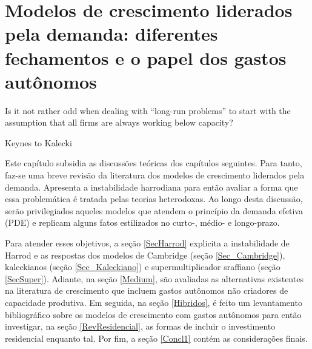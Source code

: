 \chapter{Modelos de crescimento liderados pela demanda: diferentes fechamentos e o papel dos gastos autônomos}
\label{CapTeorico}

\epigraph{Is it not rather odd when dealing with ``long-run problems'' to start with the assumption that all firms are always working below capacity?}{Keynes to Kalecki}


Este capítulo subsidia as discussões teóricas dos capítulos seguintes.
Para tanto, faz-se uma breve revisão da literatura dos modelos de crescimento liderados pela demanda. Apresenta a instabilidade harrodiana para então avaliar a forma que essa problemática é tratada pelas teorias heterodoxas.
Ao longo desta discussão, serão privilegiados aqueles modelos que atendem o princípio da demanda efetiva (PDE)  e replicam alguns fatos estilizados no curto-, médio- e longo-prazo.


Para atender esses objetivos, a seção \ref{SecHarrod} explicita a instabilidade de Harrod e as respostas dos modelos de Cambridge (seção \ref{Sec_Cambridge}), kaleckianos (seção \ref{Sec_Kaleckiano}) e supermultiplicador sraffiano (seção \ref{SecSuper}). 
Adiante, na seção \ref{Medium}, são avaliadas as alternativas existentes na literatura de crescimento que incluem gastos autônomos não criadores de capacidade produtiva.
Em seguida, na seção \ref{Hibridos}, é feito um levantamento bibliográfico sobre os modelos de crescimento com gastos autônomos para então investigar, na seção \ref{RevResidencial}, as formas de incluir o investimento residencial enquanto tal.
Por fim, a seção \ref{Concl1} contém as considerações finais.




%



\begin{comment}
mais especificamente:
\begin{itemize}
\item \textbf{Curto-prazo:} Determinação da poupança pelo investimento \cite{keynes_general_1936};
\item \textbf{Médio-prazo:} Relação positiva entre taxa de investimento e crescimento \cite{cesaratto_neo-kaleckian_2015};
\item \textbf{Longo-prazo:} Convergência ao grau de utilização ao normal\footnote{Por grau de utilização normal, adota-se a definição de \textcites[p.~423--4, Original de 1986]{ciccone_2017}: ``\textit{The `normal' utilization of capacity can therefore imply not only the expectation of a certain breadth and frequency of the fluctuations in demand, but also the expectation of the idleness of the excess capacity deliberately chosen by the entrepreneurs;}'' } \cites{ciccone_2017}{vianello_pace_1985}.
\end{itemize}
\end{comment}